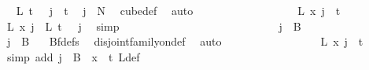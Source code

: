 \begin{isabellebody}
\ \isamarkupfalse%
\ {\isachardoublequoteopen}L\ {\isacharparenleft}{\kern0pt}t\ {\isacharminus}{\kern0pt}\ {}{\isacharparenright}{\kern0pt}\ j\ {\isacharless}{\kern0pt}\ t{\isachardoublequoteclose}\ \isamarkupfalse%
\ {\isacartoucheopen}j\ {\isasymin}\ {\isacharbraceleft}{\kern0pt}{\isachardot}{\kern0pt}{\isachardot}{\kern0pt}{\isacharless}{\kern0pt}N{\isacharprime}{\kern0pt}{\isacharbraceright}{\kern0pt}{\isacartoucheclose}\ \isamarkupfalse%
\ cube{\isacharunderscore}{\kern0pt}def\ \isamarkupfalse%
\ auto\ \isanewline
\ \ \ \ \ \ \ \ \ \ \ \ \ \ \isamarkupfalse%
\ \isamarkupfalse%
\ {\isachardoublequoteopen}L{\isacharprime}{\kern0pt}\ x\ j\ {\isasymin}\ {\isacharbraceleft}{\kern0pt}{\isachardot}{\kern0pt}{\isachardot}{\kern0pt}{\isacharless}{\kern0pt}t\ {\isacharplus}{\kern0pt}\ {}{\isacharbraceright}{\kern0pt}{\isachardoublequoteclose}\ \isamarkupfalse%
\ {\isacartoucheopen}L{\isacharprime}{\kern0pt}\ x\ j\ {\isacharequal}{\kern0pt}\ L\ {\isacharparenleft}{\kern0pt}t\ {\isacharminus}{\kern0pt}\ {}{\isacharparenright}{\kern0pt}\ j{\isacartoucheclose}\ \isamarkupfalse%
\ simp\isanewline
\ \ \ \ \ \ \ \ \ \ \ \ \isamarkupfalse%
\isanewline
\ \ \ \ \ \ \ \ \ \ \ \ \ \ \isamarkupfalse%
\ {\isachardoublequoteopen}j\ {\isasymin}\ B\ {}{\isachardoublequoteclose}\isanewline
\ \ \ \ \ \ \ \ \ \ \ \ \ \ \isamarkupfalse%
\ \isamarkupfalse%
\ {\isachardoublequoteopen}j\ {\isasymnotin}\ B\ {}{\isachardoublequoteclose}\ \isamarkupfalse%
\ Bf{\isacharunderscore}{\kern0pt}defs\ \isamarkupfalse%
\ disjoint{\isacharunderscore}{\kern0pt}family{\isacharunderscore}{\kern0pt}on{\isacharunderscore}{\kern0pt}def\ \isamarkupfalse%
\ auto\isanewline
\ \ \ \ \ \ \ \ \ \ \ \ \ \ \isamarkupfalse%
\ \isamarkupfalse%
\ {\isachardoublequoteopen}L{\isacharprime}{\kern0pt}\ x\ j\ {\isacharequal}{\kern0pt}\ t{\isachardoublequoteclose}\ \ \isamarkupfalse%
\ {\isacharparenleft}{\kern0pt}simp\ add{\isacharcolon}{\kern0pt}\ {\isacartoucheopen}j\ {\isasymin}\ B\ {}{\isacartoucheclose}\ {\isacartoucheopen}x\ {\isacharequal}{\kern0pt}\ t{\isacartoucheclose}\ L{\isacharprime}{\kern0pt}{\isacharunderscore}{\kern0pt}def{\isacharparenright}{\kern0pt}\isanewline
\ \ \ \ \ \ \ \ \ \ \ \ \ \ \isamarkupfalse%

\end{isabellebody}
